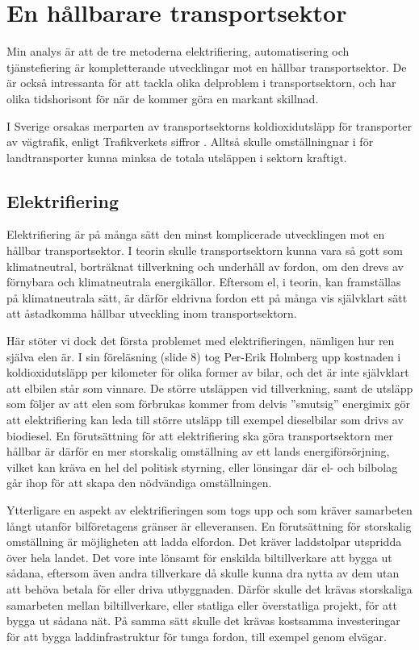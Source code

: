 \documentclass{article}
\begin{document}

\clearpage
\section{En hållbarare transportsektor}

Min analys är att de tre metoderna elektrifiering, automatisering och tjänstefiering är kompletterande utvecklingar mot en hållbar transportsektor. De är också intressanta för att tackla olika delproblem i transportsektorn, och har olika tidshorisont för när de kommer göra en markant skillnad. 

I Sverige orsakas merparten av transportsektorns koldioxidutsläpp för transporter av vägtrafik, enligt Trafikverkets siffror . Alltså skulle omställningnar i för landtransporter kunna minksa de totala utsläppen i sektorn kraftigt.

\subsection{Elektrifiering}

Elektrifiering är på många sätt den minst komplicerade utvecklingen mot en hållbar transportsektor. I teorin skulle transportsektorn kunna vara så gott som klimatneutral, borträknat tillverkning och underhåll av fordon, om den drevs av förnybara och klimatneutrala energikällor. Eftersom el, i teorin, kan framställas på klimatneutrala sätt, är därför eldrivna fordon ett på många vis självklart sätt att åstadkomma hållbar utveckling inom transportsektorn.

Här stöter vi dock det första problemet med elektrifieringen, nämligen hur ren själva elen är. I sin föreläsning (slide 8) tog Per-Erik Holmberg upp kostnaden i koldioxidutsläpp per kilometer för olika former av bilar, och det är inte självklart att elbilen står som vinnare. De större utsläppen vid tillverkning, samt de utsläpp som följer av att elen som förbrukas kommer from delvis ''smutsig'' energimix gör att elektrifiering kan leda till större utsläpp till exempel dieselbilar som drivs av biodiesel. En förutsättning för att elektrifiering ska göra transportsektorn mer hållbar är därför en mer storskalig omställning av ett lands energiförsörjning, vilket kan kräva en hel del politisk styrning, eller lönsingar där el- och bilbolag går ihop för att skapa den nödvändiga omställningen.

Ytterligare en aspekt av elektrifieringen som togs upp och som kräver samarbeten långt utanför bil\-företagens gränser är elleveransen. En förutsättning för storskalig omställning är möjligheten att ladda elfordon. Det kräver laddstolpar utspridda över hela landet. Det vore inte lönsamt för enskilda biltillverkare att bygga ut sådana, eftersom även andra tillverkare då skulle kunna dra nytta av dem utan att behöva betala för eller driva utbyggnaden. Därför skulle det krävas storskaliga samarbeten mellan biltillverkare, eller statliga eller överstatliga projekt, för att bygga ut sådana nät. På samma sätt skulle det krävas kostsamma investeringar för att bygga laddinfrastruktur för tunga fordon, till exempel genom elvägar.
\end{document}

